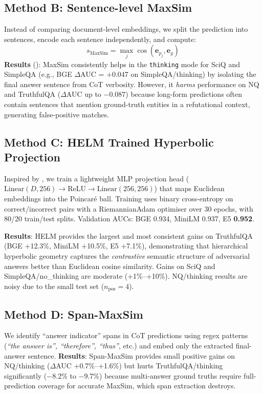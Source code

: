 \documentclass[11pt,a4paper]{article}
\begin{document}
\subsection{Method B: Sentence-level MaxSim}

Instead of comparing document-level embeddings, we split the prediction into
sentences, encode each sentence independently, and compute:
\begin{equation}
  s_{\text{MaxSim}} = \max_{j} \cos(\mathbf{e}_{p_j}, \mathbf{e}_g)
\end{equation}
\textbf{Results} ():
MaxSim consistently helps in the \texttt{thinking} mode for SciQ and SimpleQA
(e.g., BGE $\Delta$AUC = $+$0.047 on SimpleQA/thinking) by isolating the final
answer sentence from CoT verbosity.
However, it \emph{harms} performance on NQ and TruthfulQA ($\Delta$AUC up to
$-$0.087) because long-form predictions often contain sentences that mention
ground-truth entities in a refutational context, generating false-positive matches.

\subsection{Method C: HELM Trained Hyperbolic Projection}

Inspired by \citet{he2025helm}, we train a lightweight MLP projection head
($\text{Linear}(D, 256) \to \text{ReLU} \to \text{Linear}(256, 256)$) that maps
Euclidean embeddings into the Poincaré ball.
Training uses binary cross-entropy on correct/incorrect pairs with a
RiemannianAdam optimiser over 30 epochs, with 80/20 train/test splits.
Validation AUCs: BGE 0.934, MiniLM 0.937, E5 \textbf{0.952}.

\textbf{Results}: HELM provides the largest and most consistent gains on
TruthfulQA (BGE $+$12.3\%, MiniLM $+$10.5\%, E5 $+$7.1\%), demonstrating that
hierarchical hyperbolic geometry captures the \emph{contrastive} semantic structure
of adversarial answers better than Euclidean cosine similarity.
Gains on SciQ and SimpleQA/no\_thinking are moderate (+1\%–+10\%).
NQ/thinking results are noisy due to the small test set ($n_{\text{pos}}=4$).

\subsection{Method D: Span-MaxSim}

We identify ``answer indicator'' spans in CoT predictions using regex patterns
(\emph{``the answer is'', ``therefore'', ``thus''}, etc.) and embed only the
extracted final-answer sentence.
\textbf{Results}: Span-MaxSim provides small positive gains on NQ/thinking
($\Delta$AUC $+$0.7\%–$+$1.6\%) but hurts TruthfulQA/thinking significantly
($-$8.2\% to $-$9.7\%) because multi-answer ground truths require full-prediction
coverage for accurate MaxSim, which span extraction destroys.
\end{document}
